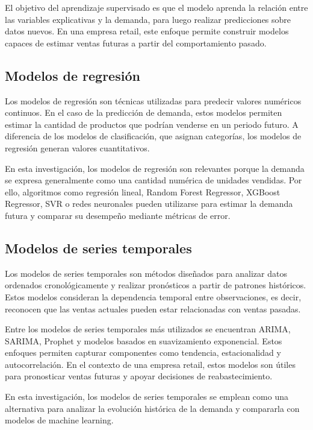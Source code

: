 El objetivo del aprendizaje supervisado es que el modelo aprenda la relación entre las variables explicativas y la demanda, para luego realizar predicciones sobre datos nuevos. En una empresa retail, este enfoque permite construir modelos capaces de estimar ventas futuras a partir del comportamiento pasado.

\subsection{Modelos de regresión}

Los modelos de regresión son técnicas utilizadas para predecir valores numéricos continuos. En el caso de la predicción de demanda, estos modelos permiten estimar la cantidad de productos que podrían venderse en un periodo futuro. A diferencia de los modelos de clasificación, que asignan categorías, los modelos de regresión generan valores cuantitativos.

En esta investigación, los modelos de regresión son relevantes porque la demanda se expresa generalmente como una cantidad numérica de unidades vendidas. Por ello, algoritmos como regresión lineal, Random Forest Regressor, XGBoost Regressor, SVR o redes neuronales pueden utilizarse para estimar la demanda futura y comparar su desempeño mediante métricas de error.

\subsection{Modelos de series temporales}

Los modelos de series temporales son métodos diseñados para analizar datos ordenados cronológicamente y realizar pronósticos a partir de patrones históricos. Estos modelos consideran la dependencia temporal entre observaciones, es decir, reconocen que las ventas actuales pueden estar relacionadas con ventas pasadas.

Entre los modelos de series temporales más utilizados se encuentran ARIMA, SARIMA, Prophet y modelos basados en suavizamiento exponencial. Estos enfoques permiten capturar componentes como tendencia, estacionalidad y autocorrelación. En el contexto de una empresa retail, estos modelos son útiles para pronosticar ventas futuras y apoyar decisiones de reabastecimiento.

En esta investigación, los modelos de series temporales se emplean como una alternativa para analizar la evolución histórica de la demanda y compararla con modelos de machine learning.

